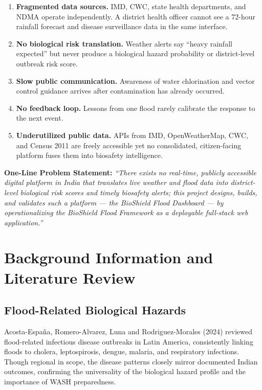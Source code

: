 \documentclass[12pt,a4paper]{report}
\begin{document}
\begin{enumerate}[noitemsep]
  \item \textbf{Fragmented data sources.} IMD, CWC, state health departments, and NDMA operate independently. A district health officer cannot see a 72-hour rainfall forecast and disease surveillance data in the same interface.
  \item \textbf{No biological risk translation.} Weather alerts say ``heavy rainfall expected'' but never produce a biological hazard probability or district-level outbreak risk score.
  \item \textbf{Slow public communication.} Awareness of water chlorination and vector control guidance arrives after contamination has already occurred.
  \item \textbf{No feedback loop.} Lessons from one flood rarely calibrate the response to the next event.
  \item \textbf{Underutilized public data.} APIs from IMD, OpenWeatherMap, CWC, and Census 2011 are freely accessible yet no consolidated, citizen-facing platform fuses them into biosafety intelligence.
\end{enumerate}

\begin{mdframed}
\textbf{One-Line Problem Statement:} \textit{``There exists no real-time, publicly accessible digital platform in India that translates live weather and flood data into district-level biological risk scores and timely biosafety alerts; this project designs, builds, and validates such a platform --- the BioShield Flood Dashboard --- by operationalizing the BioShield Flood Framework as a deployable full-stack web application.''}
\end{mdframed}

\section{Background Information and Literature Review}

\subsection{Flood-Related Biological Hazards}

Acosta-España, Romero-Alvarez, Luna and Rodriguez-Morales (2024) reviewed flood-related infectious disease outbreaks in Latin America, consistently linking floods to cholera, leptospirosis, dengue, malaria, and respiratory infections. Though regional in scope, the disease patterns closely mirror documented Indian outcomes, confirming the universality of the biological hazard profile and the importance of WASH preparedness.
\end{document}
